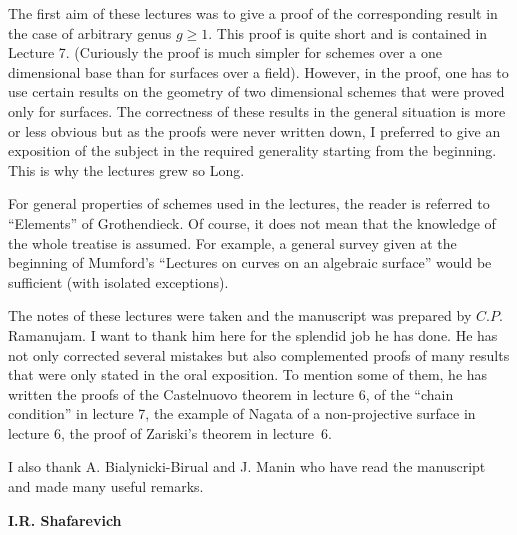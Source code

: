 The first aim of these lectures was to give a proof of the
corresponding result in the case of arbitrary genus $g \geq 1$. This
proof is quite short and is contained in Lecture 7. (Curiously the
proof is much simpler for  schemes over a one dimensional base than
for surfaces over a field). However, in the proof, one has to use
certain results on  the geometry of two dimensional schemes that were
proved only for surfaces. The correctness of these results in the
general situation is more or less obvious but as the proofs were never
written down, I preferred to give an exposition of the subject in the
required generality starting from the beginning. This is why the
lectures grew so Long.   

For general properties of schemes used in the lectures, the reader is
referred to ``Elements'' of Grothendieck. Of course, it does not mean
that the knowledge of the whole treatise is assumed. For example, a
general survey given at the beginning of Mumford's  ``Lectures on
curves on an algebraic surface'' would be sufficient (with isolated
exceptions).  

The notes of these lectures were taken and the manuscript was prepared
by $C.P$. Ramanujam. I want to thank him here for the splendid job he
has done. He has not only corrected several mistakes but also
complemented proofs of many results that were only stated in  the
oral exposition. To mention some of them, he has written the proofs of
the Castelnuovo theorem in lecture 6, of the ``chain condition'' in
lecture 7, the example of Nagata of a non-projective surface in
lecture 6, the proof of Zariski's theorem in lecture~6. 

I also thank A. Bialynicki-Birual and J. Manin who have read the
manuscript and made many useful remarks.  
\bigskip

\hfill{\large\bf I.R. Shafarevich}
